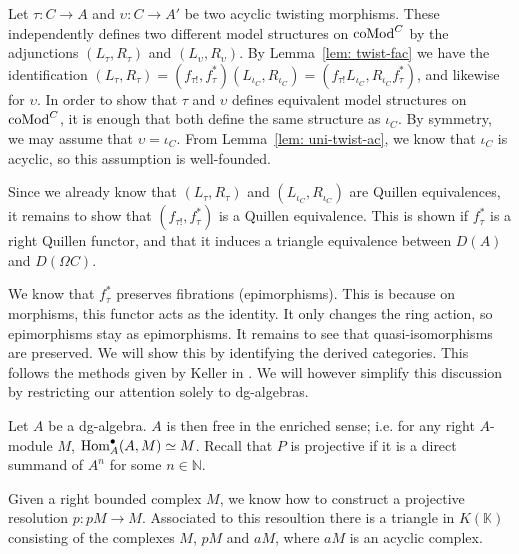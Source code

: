 \documentclass[../thesis.tex]{subfiles}
\begin{document}
            Let $\tau: C \rightarrow A$ and $\upsilon : C \rightarrow A'$ be two acyclic twisting morphisms. These independently defines two different model structures on $\tt{coMod}^C$ by the adjunctions $(L_\tau, R_\tau)$ and $(L_\upsilon, R_\upsilon)$. By Lemma~\ref{lem: twist-fac} we have the identification $(L_\tau, R_\tau) = (f_{\tau !},f_\tau^*)(L_{\iota_C},R_{\iota_C}) = (f_{\tau !}L_{\iota_C},R_{\iota_C}f_\tau^*)$, and likewise for $\upsilon$. In order to show that $\tau$ and $\upsilon$ defines equivalent model structures on $\tt{coMod}^C$, it is enough that both define the same structure as $\iota_C$. By symmetry, we may assume that $\upsilon = \iota_C$. From Lemma~\ref{lem: uni-twist-ac}, we know that $\iota_C$ is acyclic, so this assumption is well-founded.

            Since we already know that $(L_\tau, R_\tau)$ and $(L_{\iota_C}, R_{\iota_C})$ are Quillen equivalences, it remains to show that $(f_{\tau !},f_\tau^*)$ is a Quillen equivalence. This is shown if $f_\tau^*$ is a right Quillen functor, and that it induces a triangle equivalence between $D(A)$ and $D(\Omega C)$.

            We know that $f_\tau^*$ preserves fibrations (epimorphisms). This is because on morphisms, this functor acts as the identity. It only changes the ring action, so epimorphisms stay as epimorphisms. It remains to see that quasi-isomorphisms are preserved. We will show this by identifying the derived categories. This follows the methods given by Keller in \cite{Keller94}. We will however simplify this discussion by restricting our attention solely to dg-algebras.

            Let $A$ be a dg-algebra. $A$ is then free in the enriched sense; i.e. for any right $A$-module $M$, ${\tt{Hom}}^\bullet_A(A,M) \simeq M$. Recall that $P$ is projective if it is a direct summand of $A^n$ for some $n\in \mathbb{N}$. 
            
            Given a right bounded complex $M$, we know how to construct a projective resolution $p: pM \rightarrow M$. Associated to this resoultion there is a triangle in $K(\mathbb{K})$ consisting of the complexes $M$, $pM$ and $aM$, where $aM$ is an acyclic complex.

            \begin{center}
            \end{center}
\end{document}
